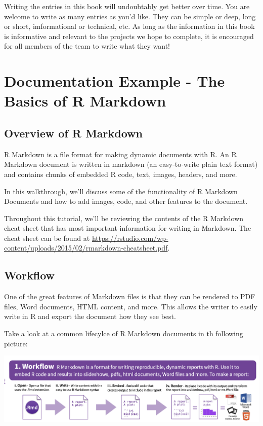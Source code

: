 \documentclass[]{book}
\begin{document}
Writing the entries in this book will undoubtably get better over time. You are welcome to write as many entries as you'd like. They can be simple or deep, long or short, imformational or technical, etc. As long as the information in this book is informative and relevant to the projects we hope to complete, it is encouraged for all members of the team to write what they want!

\hypertarget{documentation-example---the-basics-of-r-markdown}{%
\chapter{Documentation Example - The Basics of R Markdown}\label{documentation-example---the-basics-of-r-markdown}}

\hypertarget{overview-of-r-markdown}{%
\section{Overview of R Markdown}\label{overview-of-r-markdown}}

R Markdown is a file format for making dynamic documents with R. An R Markdown document is written in markdown (an easy-to-write plain text format) and contains chunks of embedded R code, text, images, headers, and more.

In this walkthrough, we'll discuss some of the functionality of R Markdown Documents and how to add images, code, and other features to the document.

Throughout this tutorial, we'll be reviewing the contents of the R Markdown cheat sheet that has most important information for writing in Markdown. The cheat sheet can be found at \url{https://rstudio.com/wp-content/uploads/2015/02/rmarkdown-cheatsheet.pdf}.

\hypertarget{workflow}{%
\section{Workflow}\label{workflow}}

One of the great features of Markdown files is that they can be rendered to PDF files, Word documents, HTML content, and more. This allows the writer to easily write in R and export the document how they see best.

Take a look at a common lifecylce of R Markdown documents in th following picture:

\includegraphics{images/workflow.png}
\end{document}
